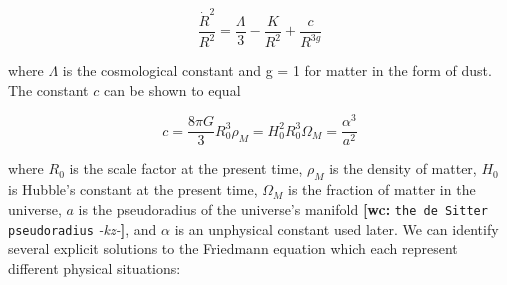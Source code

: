\documentclass[preprint,notitlepage,amsmath,amssymb,floatfix]{revtex4-1}
\newcommand{\XXX}[3]{{\bf [#1: } {\tt #3} {\it -#2-}{\bf ]}}
\begin{document}
\begin{equation}
\frac{\dot{R}^2}{R^2} = \frac{\Lambda}{3} - \frac{K}{R^2} + \frac{c}{R^{3g}}
\end{equation}

\noindent where $\Lambda$ is the cosmological constant and g = 1 for matter in the form of dust.  The constant $c$ can be shown to equal

\begin{equation}
c = \frac{8\pi G}{3}R_0^3\rho_M = H_0^2R_0^3\Omega_M = \frac{\alpha^3}{a^2}
\end{equation}

\noindent where $R_0$ is the scale factor at the present time, $\rho_M$ is the density of matter, $H_0$ is Hubble's constant at the present time, $\Omega_M$ is the fraction of matter in the universe, $a$ is the pseudoradius of the universe's manifold \XXX{wc}{kz}{the de Sitter pseudoradius}, and $\alpha$ is an unphysical constant used later.  We can identify several explicit solutions to the Friedmann equation which each represent different physical situations:
\end{document}
